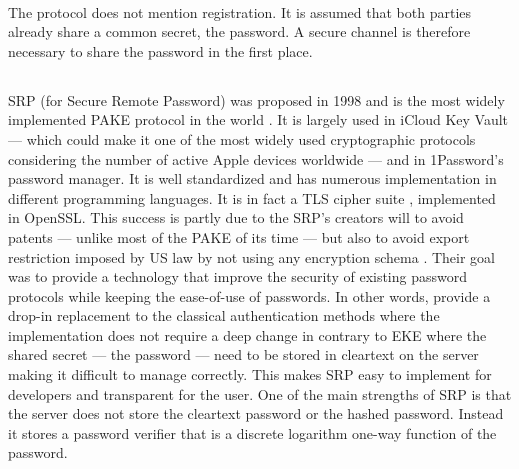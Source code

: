 ﻿\documentclass[../report.tex]{subfiles}
\begin{document}
\paragraph{}
The protocol does not mention registration. It is assumed that both parties already share a common secret, the password. A secure channel is therefore necessary to share the password in the first place.


\subsection{}
\paragraph{}
SRP \cite{SRP_Paper, SRP_6_Paper} (for Secure Remote Password) was proposed in 1998 and is the most widely implemented PAKE protocol in the world \cite{PAKE_Green_blog}.
It is largely used in iCloud Key Vault --- which could make it one of the most widely used cryptographic protocols \cite{PAKE_Green_blog} considering the number of active Apple devices worldwide --- and in 1Password's password manager.
It is well standardized and has numerous implementation in different programming languages. %
It is in fact a TLS cipher suite \cite{SRP_RFC_3}, implemented in OpenSSL.
This success is partly due to the SRP's creators will to avoid patents --- unlike most of the PAKE of its time --- but also to avoid export restriction imposed by US law by not using any encryption schema \cite{SRP_Formal_Analysis}.
Their goal was to provide a technology that improve the security of existing password protocols while keeping the ease-of-use of passwords. In other words, provide a drop-in replacement to the classical authentication methods where the implementation does not require a deep change in contrary to EKE where the shared secret --- the password --- need to be stored in cleartext on the server making it difficult to manage correctly.
This makes SRP easy to implement for developers and transparent for the user.
One of the main strengths of SRP is that the server does not store the cleartext password or the hashed password. Instead it stores a password verifier that is a discrete logarithm one-way function of the password.
\end{document}
